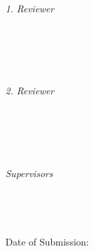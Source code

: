 \begin{titlepage}
  \centering

  \vfill
  {\large \thesisSubject} \\[5mm]
  {\LARGE \color{ctcolortitle}\textbf{\thesisTitle} \\[10mm]}
  {\Large \thesisName} \\

  \vfill
  \begin{minipage}[t]{.27\textwidth}
    \raggedleft
    \textit{1. Reviewer}
  \end{minipage}
  \hspace*{15pt}
  \begin{minipage}[t]{.65\textwidth}
    {\Large \thesisFirstReviewer} \\
    {\small \thesisFirstReviewerDepartment} \\[-1mm]
    {\small \thesisFirstReviewerUniversity}
  \end{minipage} \\[5mm]
  \begin{minipage}[t]{.27\textwidth}
    \raggedleft
    \textit{2. Reviewer}
  \end{minipage}
  \hspace*{15pt}
  \begin{minipage}[t]{.65\textwidth}
    {\Large \thesisSecondReviewer} \\
    {\small \thesisSecondReviewerDepartment} \\[-1mm]
    {\small \thesisSecondReviewerUniversity}
  \end{minipage} \\[10mm]
  \begin{minipage}[t]{.27\textwidth}
    \raggedleft
    \textit{Supervisors}
  \end{minipage}
  \hspace*{15pt}
  \begin{minipage}[t]{.65\textwidth}
    \thesisFirstSupervisor\ %
  \end{minipage} \\[10mm]

  \vspace{2cm}
  \begin{flushright}
    Date of Submission: \thesisDate \\
  \end{flushright}


\end{titlepage}

